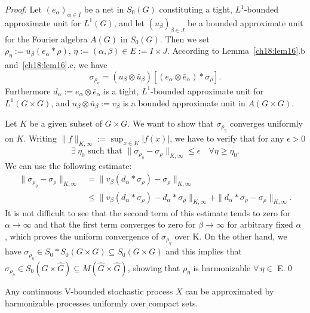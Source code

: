 \documentclass[graybox]{svmult}
\begin{document}
\begin{proof}
Let $(e_{\alpha })_{\alpha \in I}$ be a net in
${S_{0}(G)}$ constituting a tight, $L^{1}$-bounded approximate
unit for $L^{1}(G)$, and let $(u_{\beta })_{\beta \in J}$
be a bounded approximate unit for the Fourier algebra
$A(G)$ in ${S_{0}(G)}$.  Then we
set $\rho_{\eta } := u_{\beta }(e_{\alpha }\ast {}\rho), \, \eta :=
(\alpha ,\beta ) \in E := I\times J$.
According to Lemma~\ref{ch18:lem16}.b and~\ref{ch18:lem16}.c, we have
\[
\sigma _{\rho_{\eta }} = (u_{\beta }\otimes \bar{u}_{\beta
})[(e_{\alpha }\otimes \bar{e}_{\alpha })\ast {\sigma_{ \rho}} ].
\]
Furthermore $d_{\alpha } := e_{\alpha }\otimes
\bar{e}_{\alpha }  $  is  a  tight, $L^{1}$-bounded
approximate unit for $L^{1}(G\times G)$, and $u_{\beta }\otimes
\bar{u}_{\beta } := v_{\beta }$ is a bounded approximate unit in
$A(G\times G)$.

Let $K$ be a given subset of $G\times G$.  We want to show that $\sigma _{\rho_{\eta }}$ converges uniformly on
$K$.  Writing $\| f\| _{K,\infty } := \sup _{x\in K} |f(x)|$, we have
to verify that for any $\epsilon > 0$
\[
\exists \: \eta _{0} \text{ such that } \| \sigma_{\rho_{\eta}} -
{\sigma_{ \rho}}\| _{K,\infty } \le \epsilon \quad
\forall \eta \ge \eta_{0}.
\]
We can use the following estimate:
\begin{align*}
\| \sigma_{\rho_{\eta}} - {\sigma_{ \rho}}\| _{K,\infty } &
= \| v_{\beta }(d_{\alpha }\ast {}{\sigma_{ \rho}}) -
{\sigma_{ \rho}}\|_{K,\infty}\\
& \le \| v_{\beta }(d_{\alpha }\ast {}{\sigma_{ \rho}}) -
d_{\alpha }\ast
{}{\sigma_{ \rho}}\| _{K,\infty } +\| d_{\alpha }\ast {}{\sigma_{ \rho}} -
{\sigma_{ \rho}}\| _{K,\infty } .
\end{align*}
It is not difficult to see that the second term of this
estimate tends to zero for $\alpha \rightarrow \infty $ and that the
first term converges to zero for $\beta \rightarrow
\infty $ for arbitrary fixed $\alpha $ , which proves the uniform
convergence of $\sigma_{\rho_{\eta}}$ over K.  On the other hand, we have $\sigma_{\rho_{\eta}} \in
S_{0}\ast {}S_{0}(G\times G) \subseteq S_{0}(G\times G)$ and this
implies that $\hat{\sigma }_{\rho _{\eta }} \in S_{0}(\hat{G}\times
\hat{G}) \subseteq M(\hat{G}\times \hat{G})$, showing that $\rho _{\eta
}$ is harmonizable $\forall \, \eta \in $ E.\qed
\end{proof}

\setcounter{corollary}{17}
\begin{corollary}\label{ch18:cor18}
Any continuous V-bounded stochastic process
$X$ can be approximated by harmonizable processes uniformly
over compact sets.
\end{corollary}
\end{document}

